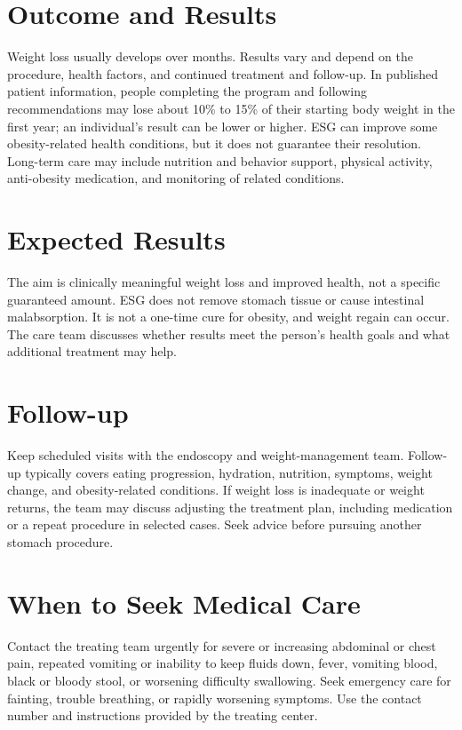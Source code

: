 \section*{Outcome and Results}
Weight loss usually develops over months. Results vary and depend on the procedure, health factors, and continued treatment and follow-up. In published patient information, people completing the program and following recommendations may lose about 10\% to 15\% of their starting body weight in the first year; an individual's result can be lower or higher. ESG can improve some obesity-related health conditions, but it does not guarantee their resolution. Long-term care may include nutrition and behavior support, physical activity, anti-obesity medication, and monitoring of related conditions.

\section*{Expected Results}
The aim is clinically meaningful weight loss and improved health, not a specific guaranteed amount. ESG does not remove stomach tissue or cause intestinal malabsorption. It is not a one-time cure for obesity, and weight regain can occur. The care team discusses whether results meet the person's health goals and what additional treatment may help.

\section*{Follow-up}
Keep scheduled visits with the endoscopy and weight-management team. Follow-up typically covers eating progression, hydration, nutrition, symptoms, weight change, and obesity-related conditions. If weight loss is inadequate or weight returns, the team may discuss adjusting the treatment plan, including medication or a repeat procedure in selected cases. Seek advice before pursuing another stomach procedure.

\section*{When to Seek Medical Care}
Contact the treating team urgently for severe or increasing abdominal or chest pain, repeated vomiting or inability to keep fluids down, fever, vomiting blood, black or bloody stool, or worsening difficulty swallowing. Seek emergency care for fainting, trouble breathing, or rapidly worsening symptoms. Use the contact number and instructions provided by the treating center.

